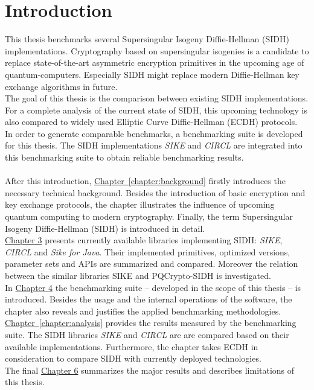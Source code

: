 \chapter{Introduction}\label{chapter:introduction}

This thesis benchmarks several Supersingular Isogeny Diffie-Hellman (\gls{SIDH}) implementations. Cryptography based on supersingular isogenies is a candidate to replace state-of-the-art asymmetric encryption primitives in the upcoming age of quantum-computers. Especially \gls{SIDH} might replace modern Diffie-Hellman key exchange algorithms in future.\\
The goal of this thesis is the comparison between existing \gls{SIDH} implementations. For a complete analysis of the current state of \gls{SIDH}, this upcoming technology is also compared to widely used Elliptic Curve Diffie-Hellman (\gls{ECDH}) protocols.\\
In order to generate comparable benchmarks, a benchmarking suite is developed for this thesis. The \gls{SIDH} implementations \textit{\gls{SIKE}} and \textit{\gls{CIRCL}} are integrated into this benchmarking suite to obtain reliable benchmarking results.
\\\\
After this introduction, \hyperref[chapter:background]{Chapter~\ref*{chapter:background}} firstly introduces the necessary technical background. Besides the introduction of basic encryption and key exchange protocols, the chapter illustrates the influence of upcoming quantum computing to modern cryptography. Finally, the term Supersingular Isogeny Diffie-Hellman (\gls{SIDH}) is introduced in detail.\\
\hyperref[chapter:existing_sidh]{Chapter 3} presents currently available libraries implementing \gls{SIDH}: \textit{\gls{SIKE}}, \textit{\gls{CIRCL}} and \textit{Sike for Java}. Their implemented primitives, optimized versions, parameter sets and APIs are summarized and compared. Moreover the relation between the similar libraries \gls{SIKE} and \gls{PQCrypto-SIDH} is investigated. \\
In \hyperref[chapter:benchmarking_suite]{Chapter 4} the benchmarking suite -- developed in the scope of this thesis -- is introduced. Besides the usage and the internal operations of the software, the chapter also reveals and justifies the applied benchmarking methodologies.\\
\hyperref[chapter:analysis]{Chapter~\ref*{chapter:analysis}} provides the results measured by the benchmarking suite. The \gls{SIDH} libraries \textit{\gls{SIKE}} and \textit{\gls{CIRCL}} are are compared based on their available implementations. Furthermore, the chapter takes \gls{ECDH} in consideration to compare \gls{SIDH} with currently deployed technologies.\\
The final \hyperref[chapter:conclusion]{Chapter 6} summarizes the major results and describes limitations of this thesis.